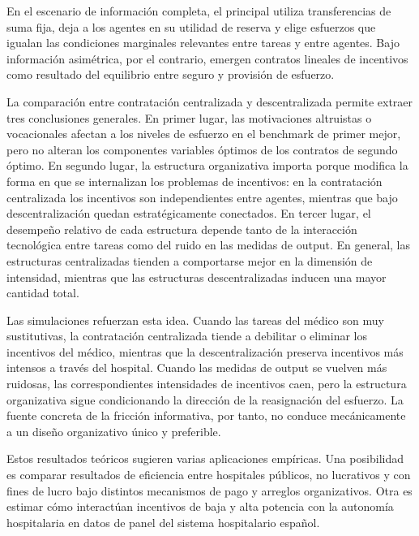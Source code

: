 ﻿\documentclass[12pt,letterpaper]{article}
\begin{document}
En el escenario de informaci\'on completa, el principal utiliza transferencias de suma fija, deja a los agentes en su utilidad de reserva y elige esfuerzos que igualan las condiciones marginales relevantes entre tareas y entre agentes. Bajo informaci\'on asim\'etrica, por el contrario, emergen contratos lineales de incentivos como resultado del equilibrio entre seguro y provisi\'on de esfuerzo.

La comparaci\'on entre contrataci\'on centralizada y descentralizada permite extraer tres conclusiones generales. En primer lugar, las motivaciones altruistas o vocacionales afectan a los niveles de esfuerzo en el benchmark de primer mejor, pero no alteran los componentes variables \'optimos de los contratos de segundo \'optimo. En segundo lugar, la estructura organizativa importa porque modifica la forma en que se internalizan los problemas de incentivos: en la contrataci\'on centralizada los incentivos son independientes entre agentes, mientras que bajo descentralizaci\'on quedan estrat\'egicamente conectados. En tercer lugar, el desempe\~no relativo de cada estructura depende tanto de la interacci\'on tecnol\'ogica entre tareas como del ruido en las medidas de output. En general, las estructuras centralizadas tienden a comportarse mejor en la dimensi\'on de intensidad, mientras que las estructuras descentralizadas inducen una mayor cantidad total.

Las simulaciones refuerzan esta idea. Cuando las tareas del m\'edico son muy sustitutivas, la contrataci\'on centralizada tiende a debilitar o eliminar los incentivos del m\'edico, mientras que la descentralizaci\'on preserva incentivos m\'as intensos a trav\'es del hospital. Cuando las medidas de output se vuelven m\'as ruidosas, las correspondientes intensidades de incentivos caen, pero la estructura organizativa sigue condicionando la direcci\'on de la reasignaci\'on del esfuerzo. La fuente concreta de la fricci\'on informativa, por tanto, no conduce mec\'anicamente a un dise\~no organizativo \'unico y preferible.

Estos resultados te\'oricos sugieren varias aplicaciones emp\'iricas. Una posibilidad es comparar resultados de eficiencia entre hospitales p\'ublicos, no lucrativos y con fines de lucro bajo distintos mecanismos de pago y arreglos organizativos. Otra es estimar c\'omo interact\'uan incentivos de baja y alta potencia con la autonom\'ia hospitalaria en datos de panel del sistema hospitalario espa\~nol.
\end{document}
